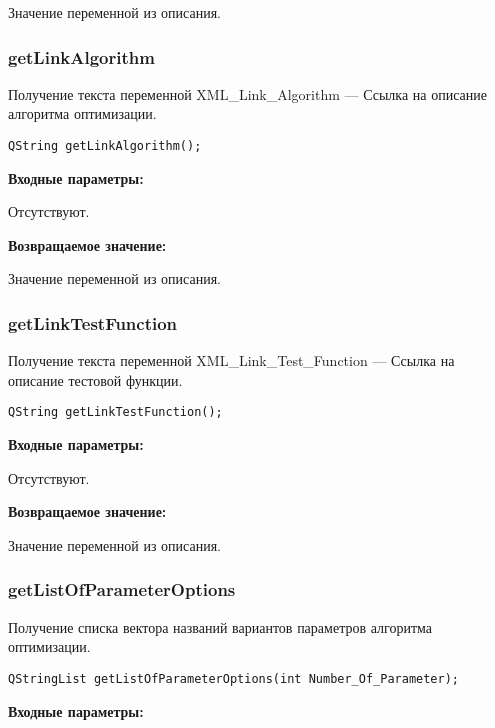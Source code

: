 \documentclass[a4paper,12pt]{article}
\begin{document}
Значение переменной из описания.


\subsubsection{getLinkAlgorithm}\label{getLinkAlgorithm}

Получение текста переменной  XML\_Link\_Algorithm --- Ссылка на описание алгоритма оптимизации.


\begin{lstlisting}[label=code_syntax_getLinkAlgorithm,caption=Синтаксис]
QString getLinkAlgorithm();
\end{lstlisting}

\textbf{Входные параметры:}

Отсутствуют.

\textbf{Возвращаемое значение:}

Значение переменной из описания.


\subsubsection{getLinkTestFunction}\label{getLinkTestFunction}

Получение текста переменной  XML\_Link\_Test\_Function --- Ссылка на описание тестовой функции.


\begin{lstlisting}[label=code_syntax_getLinkTestFunction,caption=Синтаксис]
QString getLinkTestFunction();
\end{lstlisting}

\textbf{Входные параметры:}

Отсутствуют.

\textbf{Возвращаемое значение:}

Значение переменной из описания.


\subsubsection{getListOfParameterOptions}\label{getListOfParameterOptions}

Получение списка вектора названий вариантов параметров алгоритма оптимизации.


\begin{lstlisting}[label=code_syntax_getListOfParameterOptions,caption=Синтаксис]
QStringList getListOfParameterOptions(int Number_Of_Parameter);
\end{lstlisting}

\textbf{Входные параметры:}
\end{document}
